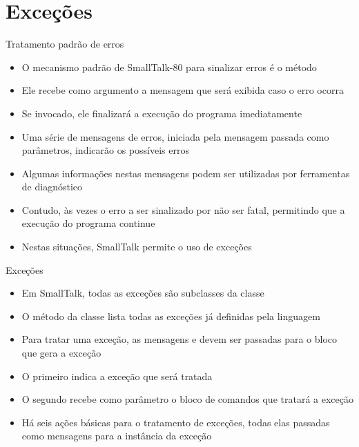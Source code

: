 \section{Exceções}

\begin{frame}[fragile]{Tratamento padrão de erros}

    \begin{itemize}
        \item O mecanismo padrão de SmallTalk-80 para sinalizar erros é o método

        \item Ele recebe como argumento a mensagem que será exibida caso o erro ocorra

        \item Se invocado, ele finalizará a execução do programa imediatamente

        \item Uma série de mensagens de erros, iniciada pela mensagem passada como parâmetros,
            indicarão os possíveis erros

        \item Algumas informações nestas mensagens podem ser utilizadas por ferramentas de
            diagnóstico

        \item Contudo, às vezes o erro a ser sinalizado por não ser fatal, permitindo que a 
            execução do programa continue

        \item Nestas situações, SmallTalk permite o uso de exceções
    \end{itemize}

\end{frame}

\begin{frame}[fragile]{Exceções}

    \begin{itemize}
        \item Em SmallTalk, todas as exceções são subclasses da classe 

        \item O método  da classe  lista
            todas as exceções já definidas pela linguagem

        \item Para tratar uma exceção, as mensagens  e 
             devem ser passadas para o bloco que gera a exceção

        \item O primeiro indica a exceção que será tratada

        \item O segundo recebe como parâmetro o bloco de comandos que tratará a exceção

        \item Há seis ações básicas para o tratamento de exceções, todas elas passadas como
            mensagens para a instância da exceção
    \end{itemize}

\end{frame}


